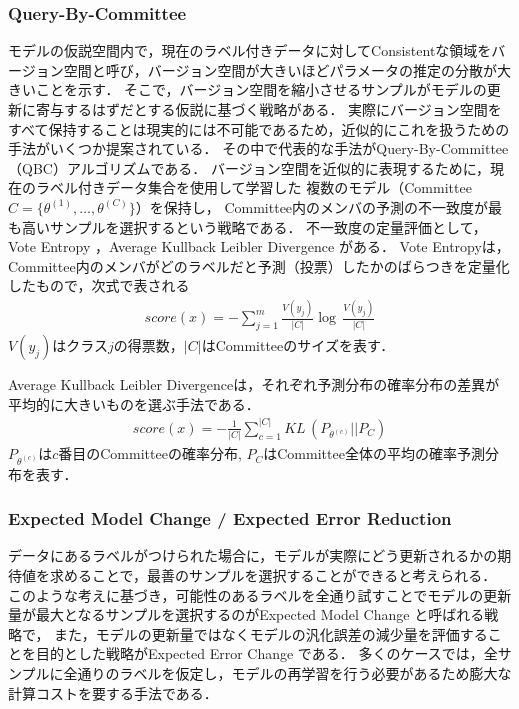 \subsubsection{Query-By-Committee \cite{seung1992query}}
モデルの仮説空間内で，現在のラベル付きデータに対してConsistentな領域をバージョン空間と呼び，バージョン空間が大きいほどパラメータの推定の分散が大きいことを示す．
そこで，バージョン空間を縮小させるサンプルがモデルの更新に寄与するはずだとする仮説に基づく戦略がある．
実際にバージョン空間をすべて保持することは現実的には不可能であるため，近似的にこれを扱うための手法がいくつか提案されている．
その中で代表的な手法がQuery-By-Committee（QBC）アルゴリズム\cite{seung1992query}である．
バージョン空間を近似的に表現するために，現在のラベル付きデータ集合を使用して学習した
複数のモデル（Committee $C=\{ \theta^{(1)}, \dots, \theta^{(C)}\}$）を保持し，
Committee内のメンバの予測の不一致度が最も高いサンプルを選択するという戦略である．
不一致度の定量評価として，Vote Entropy \cite{dagan1995committee}，Average Kullback Leibler Divergence \cite{mccallum1998employing}がある．
Vote Entropyは，Committee内のメンバがどのラベルだと予測（投票）したかのばらつきを定量化したもので，次式で表される
\begin{eqnarray}
    score(x) =  - \sum_{j=1}^{m} \frac{V(y_j)}{|C|} \log \, \frac{V(y_j)}{|C|}
\end{eqnarray}
$V(y_j)$はクラス$j$の得票数，$|C|$はCommitteeのサイズを表す．

Average Kullback Leibler Divergenceは，それぞれ予測分布の確率分布の差異が平均的に大きいものを選ぶ手法である．
\begin{eqnarray}
    score(x) =  -  \frac{1}{|C|} \sum_{c=1}^{|C|} KL \, (P_{\theta^{(c)}} || P_{C})
\end{eqnarray}
$P_{\theta^{(c)}}$は$c$番目のCommitteeの確率分布, $P_C$はCommittee全体の平均の確率予測分布を表す．

\subsubsection{Expected Model Change \cite{settles2008multiple} / Expected Error Reduction \cite{roy2001toward}}
データにあるラベルがつけられた場合に，モデルが実際にどう更新されるかの期待値を求めることで，最善のサンプルを選択することができると考えられる．
このような考えに基づき，可能性のあるラベルを全通り試すことでモデルの更新量が最大となるサンプルを選択するのがExpected Model Change \cite{settles2008multiple}と呼ばれる戦略で，
また，モデルの更新量ではなくモデルの汎化誤差の減少量を評価することを目的とした戦略がExpected Error Change \cite{roy2001toward}である．
多くのケースでは，全サンプルに全通りのラベルを仮定し，モデルの再学習を行う必要があるため膨大な計算コストを要する手法である．

